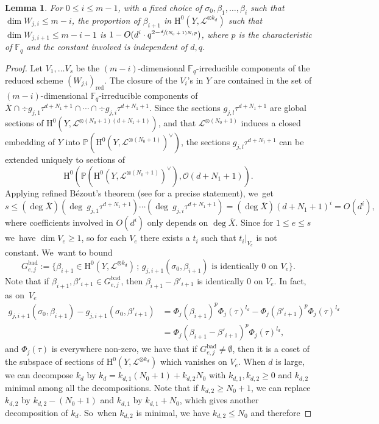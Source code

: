 \documentclass[11pt]{article}
\numberwithin{equation}{section}
\newcommand{\sep}{\,;\,}
\theoremstyle{plain}
\newtheorem{lem}[thm]{Lemma}
\theoremstyle{definition}
\newcommand{\ho}{\mathrm{H}}
\newcommand{\li}{\mathcal{L}}
\newcommand{\pr}{\mathbb{P}}
\newcommand{\F}{\mathbb{F}}
\begin{document}
\begin{lem}\label{reddim}
For $0\leq i\leq m-1$, with a fixed choice of $\sigma_0,\beta_1,\dots, \beta_i$ such that $\dim W_{j,i}\leq m-i$, the proportion of $\beta_{i+1}$ in $\ho^0(Y,\mathcal{L}^{\otimes k_d})$ such that $\dim W_{j,i+1} \leq m-i-1$ is $1-O(d^i\cdot q^{2-\sfrac{d}{(N_0+1)N_1p}})$, where $p$ is the characteristic of $\F_q$ and the constant involved is independent of $d,q$.
\end{lem}
\begin{proof}[Proof]
Let $V_1,\dots V_s$ be the $(m-i)$-dimensional $\F_q$-irreducible components of the reduced scheme $(W_{j.i})_{\mathrm{red}}$. The closure of the $V_i$'s in $Y$ are contained in the set of $(m-i)$-dimensional $\F_q$-irreducible components of $\overline{X}\cap \div g_{j,1}\tau^{d+N_1+1}\cap \cdots \cap \div g_{j,i}\tau^{d+N_1+1}$. Since the sections $g_{j,l}\tau^{d+N_1+1}$ are global sections of $\ho^0(Y, \li^{\otimes (N_0+1)(d+N_1+1)})$, and that $\li^{\otimes (N_0+1)}$ induces a closed embedding of $Y$ into $\pr(\ho^0(Y, \li^{\otimes (N_0+1)})^{\vee})$, the sections $g_{j,l}\tau^{d+N_1+1}$ can be extended uniquely to sections of
\[
\ho^0(\pr(\ho^0(Y, \li^{\otimes (N_0+1)})^{\vee}), \mathcal{O}(d+N_1+1)).
\]
Applying refined Bézout's theorem (see \cite[Th.\,12.3]{Fu84} for a precise statement), we~get
\[
s\leq (\deg \overline{X})(\deg \ g_{j,1}\tau^{d+N_1+1})\cdots (\deg \ g_{j,i}\tau^{d+N_1+1})=(\deg \overline{X})(d+N_1+1)^i=O(d^i),
\]
where coefficients involved in $O(d^i)$ only depends on $\deg \overline{X}$.
Since for $1\leq e\leq s$ we~have $\dim V_e\geq 1$, so for each $V_e$ there exists a $t_i$ such that $t_i|_{V_e}$ is not constant. We~want to bound
\[
G_{e,j}^{\mathrm{bad}}:=\bigl\{ \beta_{i+1}\in \ho^0(Y, \li^{\otimes k_d}) \sep g_{j, i+1}(\sigma_0, \beta_{i+1}) \text{ is identically }0 \text{ on }V_e \bigr\}.
\]
Note that if $\beta_{i+1},\beta'_{i+1}\!\in\! G_{e,j}^{\mathrm{bad}}$, then $\beta_{i+1}-\beta'_{i+1}$ is identically $0$ on $V_e$. In fact, as on~$V_e$
\begin{align*}
g_{j,i+1}(\sigma_0, \beta_{i+1})-g_{j,i+1}(\sigma_0, \beta'_{i+1})&= \Phi_j(\beta_{i+1})^p\Phi_j(\tau)^{l_d}-\Phi_j(\beta'_{i+1})^p\Phi_j(\tau)^{l_d} \\
&= \Phi_j(\beta_{i+1}-\beta'_{i+1})^p\Phi_j(\tau)^{l_d},
\end{align*}
and $\Phi_j(\tau)$ is everywhere non-zero, we have that if $G_{e,j}^{\mathrm{bad}}\not=\emptyset$, then it is a coset of the subspace of sections of $\ho^0(Y, \li^{\otimes k_d})$ which vanishes on $V_e$. When $d$ is large, we can decompose $k_d$ by $k_d=k_{d,1}(N_0+1)+k_{d,2}N_0$ with $k_{d,1},k_{d,2}\geq 0$ and $k_{d,2}$ minimal among all the decompositions. Note that if $k_{d,2}\geq N_0+1$, we can replace $k_{d,2}$ by $k_{d,2}-(N_0+1)$ and $k_{d,1}$ by $k_{d,1}+N_0$, which gives another decomposition of $k_d$. So~when $k_{d,2}$ is minimal, we have $k_{d,2}\leq N_0$ and therefore

\end{proof}
\end{document}
